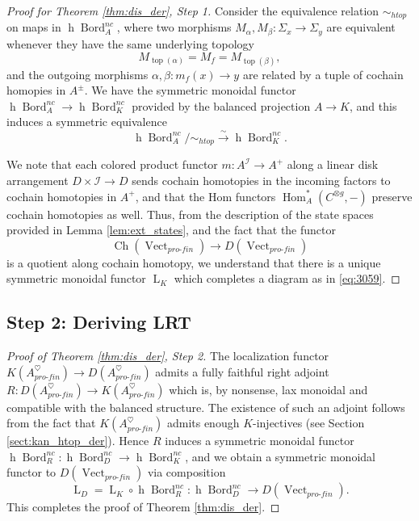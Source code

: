 \documentclass[reqno]{amsart}
\theoremstyle{definition}
\newcommand{\mcl}[1]{\mathcal{#1}}
\newcommand{\opn}[1]{\operatorname{#1}}
\newcommand{\ot}{\otimes}
\newcommand{\pf}{pro\text{-}fin}
\DeclareMathOperator{\Hom}{Hom}
\DeclareMathOperator{\Bord}{Bord}
\renewcommand{\1}{\mathbf{1}}
\begin{document}
\begin{proof}[Proof for Theorem \ref{thm:dis_der}, Step 1]
Consider the equivalence relation $\sim_{htop}$ on maps in $\opn{h}\Bord^{nc}_A$, where two morphisms $M_{\alpha},M_{\beta}:\Sigma_x\to \Sigma_y$ are equivalent whenever they have the same underlying topology
\[
M_{\opn{top}(\alpha)}=M_f=M_{\opn{top}(\beta)},
\]
and the outgoing morphisms $\alpha,\beta:m_f(x)\to y$ are related by a tuple of cochain homopies in $A^{\pm}$. We have the symmetric monoidal functor $\opn{h}\Bord^{nc}_A\to \opn{h}\Bord^{nc}_K$ provided by the balanced projection $A\to K$, and this induces a symmetric equivalence
\[
\opn{h}\Bord^{nc}_A/\sim_{htop}\overset{\sim}\to \opn{h}\Bord^{nc}_K.
\]

We note that each colored product functor $m:A^{\mcl{I}}\to A^+$ along a linear disk arrangement $D\times \mcl{I}\to D$ sends cochain homotopies in the incoming factors to cochain homotopies in $A^+$, and that the Hom functors $\Hom_A^{\ast}(C^{\ot g},-)$ preserve cochain homotopies as well. Thus, from the description of the state spaces provided in Lemma \ref{lem:ext_states}, and the fact that the functor
\[
\opn{Ch}(\opn{Vect}_{\pf})\to D(\opn{Vect}_{\pf})
\]
is a quotient along cochain homotopy, we understand that there is a unique symmetric monoidal functor $\opn{L}_K$ which completes a diagram as in \eqref{eq:3059}.
\end{proof}

\subsection{Step 2: Deriving LRT}

\begin{proof}[Proof of Theorem \ref{thm:dis_der}, Step 2]
The localization functor $K(A^{\heartsuit}_{\pf})\to D(A^{\heartsuit}_{\pf})$ admits a fully faithful right adjoint $R:D(A^{\heartsuit}_{\pf})\to K(A^{\heartsuit}_{\pf})$ which is, by nonsense, lax monoidal and compatible with the balanced structure. The existence of such an adjoint follows from the fact that $K(A^{\heartsuit}_{\pf})$ admits enough $K$-injectives (see Section \ref{sect:kan_htop_der}). Hence $R$ induces a symmetric monoidal functor $\opn{h}\Bord_R^{nc}:\opn{h}\Bord_D^{nc}\to \opn{h}\Bord_K^{nc}$, and we obtain a symmetric monoidal functor to $D(\opn{Vect}_{\pf})$ via composition
\[
\opn{L}_D=\opn{L}_K\circ \opn{h}\Bord_R^{nc}:\opn{h}\Bord^{nc}_D\to D(\opn{Vect}_{\pf}).
\]
This completes the proof of Theorem \ref{thm:dis_der}.
\end{proof}
\end{document}
